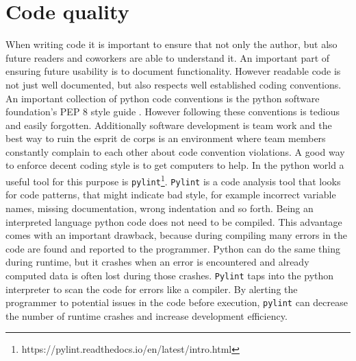 \section{Code quality}
When writing code it is important to ensure that not only the author, but also future readers and coworkers are able to understand it. An important part of ensuring future usability is to document functionality. However readable code is not just well documented, but also respects well established coding conventions. An important collection of python code conventions is the python software foundation's PEP 8 style guide \cite{VanRossum2001}. However following these conventions is tedious and easily forgotten. Additionally software development is team work and the best way to ruin the esprit de corps is an environment where team members constantly complain to each other about code convention violations.
A good way to enforce decent coding style is to get computers to help. In the python world a useful tool for this purpose is \texttt{pylint}\footnote{https://pylint.readthedocs.io/en/latest/intro.html}. \texttt{Pylint} is a code analysis tool that looks for code patterns, that might indicate bad style, for example incorrect variable names, missing documentation, wrong indentation and so forth. 
Being an interpreted language python code does not need to be compiled. This advantage comes with an important drawback, because during compiling many errors in the code are found and reported to the programmer. Python can do the same thing during runtime, but it crashes when an error is encountered and already computed data is often lost during those crashes. \texttt{Pylint} taps into the python interpreter to scan the code for errors like a compiler. By alerting the programmer to potential issues in the code before execution, \texttt{pylint} can decrease the number of runtime crashes and increase development efficiency.    

